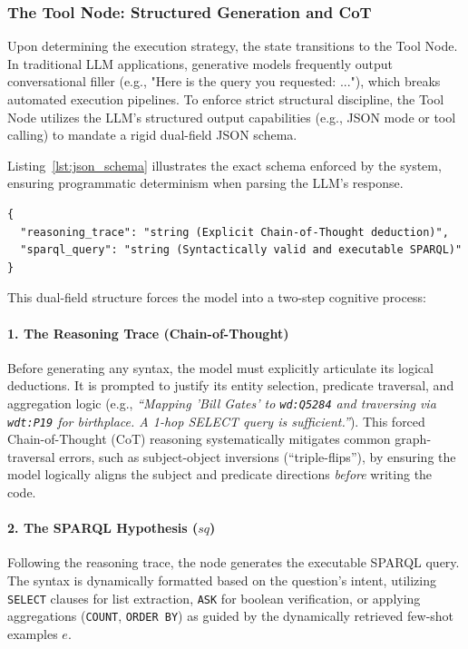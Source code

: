 \subsubsection{The Tool Node: Structured Generation and CoT}
Upon determining the execution strategy, the state transitions to the Tool Node. In traditional LLM applications, generative models frequently output conversational filler (e.g., "Here is the query you requested: ..."), which breaks automated execution pipelines. To enforce strict structural discipline, the Tool Node utilizes the LLM's structured output capabilities (e.g., JSON mode or tool calling) to mandate a rigid dual-field JSON schema.

Listing~\ref{lst:json_schema} illustrates the exact schema enforced by the system, ensuring programmatic determinism when parsing the LLM's response.

\begin{lstlisting}[basicstyle=\ttfamily\footnotesize, frame=single, caption={The mandated JSON schema enforced by the Tool Node to guarantee programmatic parsing of the generated query.}, label={lst:json_schema}]
{
  "reasoning_trace": "string (Explicit Chain-of-Thought deduction)",
  "sparql_query": "string (Syntactically valid and executable SPARQL)"
}
\end{lstlisting}

This dual-field structure forces the model into a two-step cognitive process:
\paragraph{1. The Reasoning Trace (Chain-of-Thought)}
Before generating any syntax, the model must explicitly articulate its logical deductions. It is prompted to justify its entity selection, predicate traversal, and aggregation logic (e.g., \textit{``Mapping 'Bill Gates' to \texttt{wd:Q5284} and traversing via \texttt{wdt:P19} for birthplace. A 1-hop SELECT query is sufficient.''}). This forced Chain-of-Thought (CoT) reasoning systematically mitigates common graph-traversal errors, such as subject-object inversions (``triple-flips''), by ensuring the model logically aligns the subject and predicate directions \textit{before} writing the code.

\paragraph{2. The SPARQL Hypothesis ($sq$)}
Following the reasoning trace, the node generates the executable SPARQL query. The syntax is dynamically formatted based on the question's intent, utilizing \texttt{SELECT} clauses for list extraction, \texttt{ASK} for boolean verification, or applying aggregations (\texttt{COUNT}, \texttt{ORDER BY}) as guided by the dynamically retrieved few-shot examples $e$.

